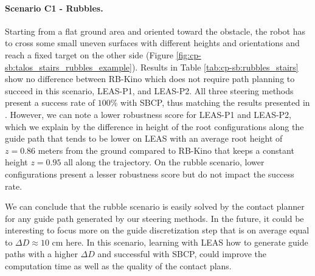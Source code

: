 \paragraph{Scenario C1 - Rubbles.}
Starting from a flat ground area and oriented toward the obstacle, the robot has to cross some small uneven surfaces with different heights and orientations and reach a fixed target on the other side (Figure \ref{fig:cp-sb:talos_stairs_rubbles_example}).
Results in Table \ref{tab:cp-sb:rubbles_stairs} show no difference between RB-Kino which does not require path planning to succeed in this scenario, LEAS-P1, and LEAS-P2. All three steering methods present a success rate of $100$\% with SBCP, thus matching the results presented in \cite{AcyclicCP}.
However, we can note a lower robustness score for LEAS-P1 and LEAS-P2, which we explain by the difference in height of the root configurations along the guide path that tends to be lower on LEAS with an average root height of $z=0.86$ meters from the ground compared to RB-Kino that keeps a constant height $z=0.95$ all along the trajectory.
On the rubble scenario, lower configurations present a lesser robustness score but do not impact the success rate.

We can conclude that the rubble scenario is easily solved by the contact planner for any guide path generated by our steering methods. 
In the future, it could be interesting to focus more on the guide discretization step that is on average equal to $\Delta D \approx10$ cm here. In this scenario, learning with LEAS how to generate guide paths with a higher $\Delta D$ and successful with SBCP, could improve the computation time as well as the quality of the contact plans. %


